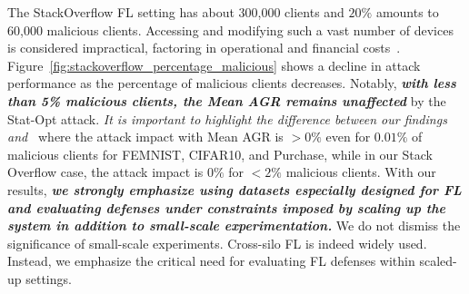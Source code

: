 The StackOverflow FL setting has about 300,000 clients and $20\%$ amounts to 60,000 malicious clients. Accessing and modifying such a vast number of devices is considered impractical, factoring in operational and financial costs~\cite{shejwalkar2022back}. Figure~\ref{fig:stackoverflow_percentage_malicious} shows a decline in attack performance as the percentage of malicious clients decreases. Notably, \emph{\textbf{with less than 5\% malicious clients, the Mean AGR remains unaffected}} by the Stat-Opt attack.
\emph{It is important to highlight the difference between our findings and~\cite{shejwalkar2022back}} where the attack impact with Mean AGR is $>0\%$ even for $0.01\%$ of malicious clients for FEMNIST, CIFAR10, and Purchase, while in our Stack Overflow case, the attack impact is $0\%$ for $<2\%$ malicious clients. With our results, \emph{\textbf{we strongly emphasize using datasets especially designed for FL and evaluating defenses under constraints imposed by scaling up the system in addition to small-scale experimentation.}} We do not dismiss the significance of small-scale experiments. Cross-silo
FL is indeed widely used. Instead, we emphasize the critical need for evaluating FL defenses within scaled-up settings.
